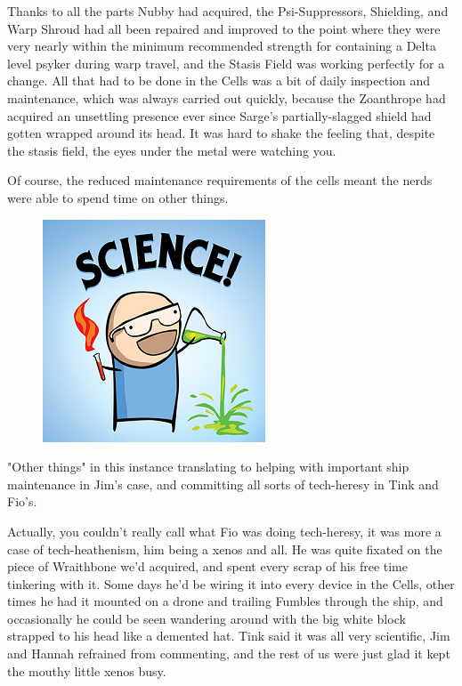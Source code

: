 Thanks to all the parts Nubby had acquired, the Psi-Suppressors, Shielding, and Warp Shroud had all been repaired and improved to the point where they were very nearly within the minimum recommended strength for containing a Delta level psyker during warp travel, and the Stasis Field was working perfectly for a change. 
All that had to be done in the Cells was a bit of daily inspection and maintenance, which was always carried out quickly, because the Zoanthrope had acquired an unsettling presence ever since Sarge's partially-slagged shield had gotten wrapped around its head. 
It was hard to shake the feeling that, despite the stasis field, the eyes under the metal were watching you.

Of course, the reduced maintenance requirements of the cells meant the nerds were able to spend time on other things.

\begin{figure}
	\begin{center}
		\includegraphics[width=\figwidth]{pics/15/9.png}
	\end{center}
\end{figure}
"Other things" in this instance translating to helping with important ship maintenance in Jim's case, and committing all sorts of tech-heresy in Tink and Fio's. 


Actually, you couldn't really call what Fio was doing tech-heresy, it was more a case of tech-heathenism, him being a xenos and all. 
He was quite fixated on the piece of Wraithbone we'd acquired, and spent every scrap of his free time tinkering with it. 
Some days he'd be wiring it into every device in the Cells, other times he had it mounted on a drone and trailing Fumbles through the ship, and occasionally he could be seen wandering around with the big white block strapped to his head like a demented hat. 
Tink said it was all very scientific, Jim and Hannah refrained from commenting, and the rest of us were just glad it kept the mouthy little xenos busy.

